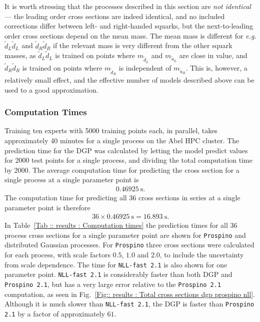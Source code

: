 \documentclass[twoside,english]{uiofysmaster}
\begin{document}
{It is worth stressing that the processes described in this section are \textit{not identical} --- the leading order cross sections are indeed identical, and no included corrections differ between left- and right-handed squarks, but the next-to-leading order cross sections depend on the mean mass. The mean mass is different for \textit{e.g.} $\widetilde{d}_L \widetilde{d}_L$ and $\widetilde{d}_R \widetilde{d}_R$ if the relevant mass is very different from the other squark masses, as $\widetilde{d}_L \widetilde{d}_L$ is trained on points where $m_{\widetilde{d}_L}$ and $m_{\widetilde{u}_L}$ are close in value, and $\widetilde{d}_R \widetilde{d}_R$ is trained on points where $m_{\widetilde{d}_R}$ is independent of $m_{\widetilde{u}_R}$. This is, however, a relatively small effect, and the effective number of models described above can be used to a good approximation.
 





\subsubsection{Computation Times}

Training ten experts with 5000 training points each, in parallel, takes approximately 40 minutes for a single process on the Abel HPC cluster. The prediction time for the DGP was calculated by letting the model predict values for 2000 test points for a  single process, and dividing the total computation time by 2000. The average computation time for predicting the cross section for a single process at a single parameter point is
\begin{align}
0.46925~\mathrm{s}.
\end{align}
The computation time for predicting all 36 cross sections in series at a single parameter point is therefore
\begin{align}
36 \times 0.46925~\mathrm{s} = 16.893~\mathrm{s}.
\end{align}
In Table~\ref{Tab :: results : Computation times} the prediction times for all 36 process cross sections for a single parameter point are shown for \verb|Prospino| and distributed Gaussian processes. For \verb|Prospino| three cross sections were calculated for each process, with scale factors $0.5$, $1.0$ and $2.0$, to include the uncertainty from scale dependence. The time for \verb|NLL-fast 2.1| is also shown for one parameter point.  \verb|NLL-fast 2.1| is considerably faster than both DGP and \verb|Prospino 2.1|, but has a very large error relative to the \verb|Prospino 2.1| computation, as seen in Fig.~\ref{Fig:: results : Total cross sections dgp prospino nll}. Although it is much slower than \verb|NLL-fast 2.1|, the DGP is faster than \verb|Prospino 2.1| by a factor of approximately $61$.

}
\end{document}
